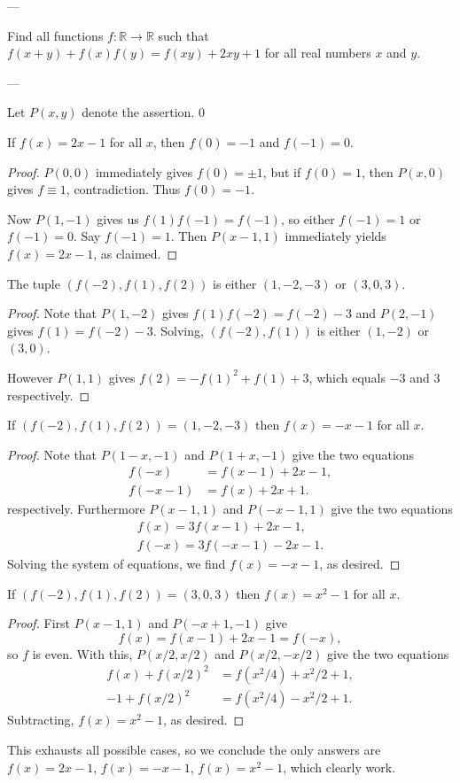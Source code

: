 
---

Find all functions $f:\mathbb R\to\mathbb R$ such that $f(x+y)+f(x)f(y)=f(xy)+2xy+1$ for all real numbers $x$ and $y$.

---

Let $P(x,y)$ denote the assertion.
\setcounter{iclaim}0
\begin{iclaim}
    If $f(x)=2x-1$ for all $x$, then $f(0)=-1$ and $f(-1)=0$.
\end{iclaim}
\begin{proof}
    $P(0,0)$ immediately gives $f(0)=\pm1$, but if $f(0)=1$, then $P(x,0)$ gives $f\equiv1$, contradiction. Thus $f(0)=-1$.

    Now $P(1,-1)$ gives us $f(1)f(-1)=f(-1)$, so either $f(-1)=1$ or $f(-1)=0$. Say $f(-1)=1$. Then $P(x-1,1)$ immediately yields $f(x)=2x-1$, as claimed.
\end{proof}
\begin{iclaim}
    The tuple $(f(-2),f(1),f(2))$ is either $(1,-2,-3)$ or $(3,0,3)$.
\end{iclaim}
\begin{proof}
    Note that $P(1,-2)$ gives $f(1)f(-2)=f(-2)-3$ and $P(2,-1)$ gives $f(1)=f(-2)-3$. Solving, $(f(-2),f(1))$ is either $(1,-2)$ or $(3,0)$.

    However $P(1,1)$ gives $f(2)=-f(1)^2+f(1)+3$, which equals $-3$ and $3$ respectively.
\end{proof}
\begin{iclaim}
    If $(f(-2),f(1),f(2))=(1,-2,-3)$ then $f(x)=-x-1$ for all $x$.
\end{iclaim}
\begin{proof}
    Note that $P(1-x,-1)$ and $P(1+x,-1)$ give the two equations
    \begin{align*}
        f(-x)&=f(x-1)+2x-1,\\
        f(-x-1)&=f(x)+2x+1.
    \end{align*}
    respectively. Furthermore $P(x-1,1)$ and $P(-x-1,1)$ give the two equations
    \begin{align*}
        f(x)=3f(x-1)+2x-1,\\
        f(-x)=3f(-x-1)-2x-1.
    \end{align*}
    Solving the system of equations, we find $f(x)=-x-1$, as desired.
\end{proof}
\begin{iclaim}
    If $(f(-2),f(1),f(2))=(3,0,3)$ then $f(x)=x^2-1$ for all $x$.
\end{iclaim}
\begin{proof}
    First $P(x-1,1)$ and $P(-x+1,-1)$ give \[f(x)=f(x-1)+2x-1=f(-x),\]
    so $f$ is even. With this, $P(x/2,x/2)$ and $P(x/2,-x/2)$ give the two equations
    \begin{align*}
        f(x)+f(x/2)^2&=f(x^2/4)+x^2/2+1,\\
        -1+f(x/2)^2&=f(x^2/4)-x^2/2+1.
    \end{align*}
    Subtracting, $f(x)=x^2-1$, as desired.
\end{proof}

This exhausts all possible cases, so we conclude the only answers are $f(x)=2x-1$, $f(x)=-x-1$, $f(x)=x^2-1$, which clearly work.


